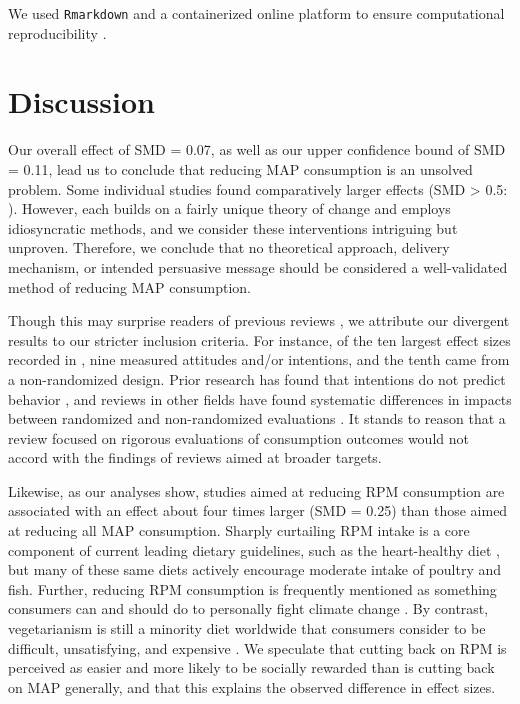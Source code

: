 \documentclass[sn-nature,referee,pdflatex]{sn-jnl}
\begin{document}
We used \texttt{Rmarkdown} \citep{xie2018} and a containerized
\citep{moreau2023} online platform \citep{clyburne2019} to ensure
computational reproducibility \citep{polanin2020}.

\section{Discussion}\label{discussion}

Our overall effect of SMD = 0.07, as well as our upper confidence bound
of SMD = 0.11, lead us to conclude that reducing MAP consumption is an
unsolved problem. Some individual studies found comparatively larger
effects (SMD \textgreater{} 0.5:
\citep{carfora2023, merrill2009, kanchanachitra2020, bianchi2022, piester2020}).
However, each builds on a fairly unique theory of change and employs
idiosyncratic methods, and we consider these interventions intriguing
but unproven. Therefore, we conclude that no theoretical approach,
delivery mechanism, or intended persuasive message should be considered
a well-validated method of reducing MAP consumption.

Though this may surprise readers of previous reviews
\citep{mathur2021meta, meier2022, mertens2022}, we attribute our
divergent results to our stricter inclusion criteria. For instance, of
the ten largest effect sizes recorded in
\citep{mathur2021effectiveness}, nine measured attitudes and/or
intentions, and the tenth came from a non-randomized design. Prior
research has found that intentions do not predict behavior
\citep{mathur2021effectiveness}, and reviews in other fields have found
systematic differences in impacts between randomized and non-randomized
evaluations \citep{porat2024, stevenson2023}. It stands to reason that a
review focused on rigorous evaluations of consumption outcomes would not
accord with the findings of reviews aimed at broader targets.

Likewise, as our analyses show, studies aimed at reducing RPM
consumption are associated with an effect about four times larger (SMD =
0.25) than those aimed at reducing all MAP consumption. Sharply
curtailing RPM intake is a core component of current leading dietary
guidelines, such as the heart-healthy diet \citep{diab2023}, but many of
these same diets actively encourage moderate intake of poultry and fish.
Further, reducing RPM consumption is frequently mentioned as something
consumers can and should do to personally fight climate change
\citep{auclair2024}. By contrast, vegetarianism is still a minority diet
worldwide \citep{tilman2014} that consumers consider to be difficult,
unsatisfying, and expensive \citep{bryant2019}. We speculate that
cutting back on RPM is perceived as easier and more likely to be
socially rewarded than is cutting back on MAP generally, and that this
explains the observed difference in effect sizes.
\end{document}
